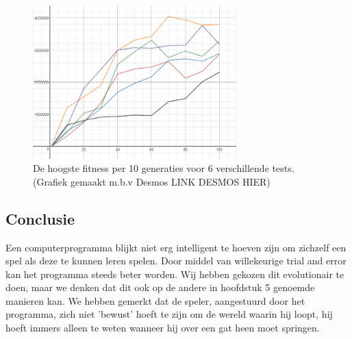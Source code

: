 \documentclass[a4paper,titlepage]{article}
\begin{document}
\begin{figure}[h]
  \centering
    \includegraphics[width=0.7\textwidth]{EvolutionResults.png}
  \caption{De hoogste fitness per 10 generaties voor 6 verschillende tests. (Grafiek gemaakt m.b.v Desmos LINK DESMOS HIER)}
  \label{fig:EvolutionResults}
\end{figure}

\subsection{Conclusie}
Een computerprogramma blijkt niet erg intelligent te hoeven zijn om zichzelf een spel als deze te kunnen leren spelen. Door middel van willekeurige trial and error kan het programma steeds beter worden. Wij hebben gekozen dit evolutionair te doen, maar we denken dat dit ook op de andere in hoofdstuk 5 genoemde manieren kan. We hebben gemerkt dat de speler, aangestuurd door het programma, zich niet 'bewust' hoeft te zijn om de wereld waarin hij loopt, hij hoeft immers alleen te weten wanneer hij over een gat heen moet springen.
\end{document}
